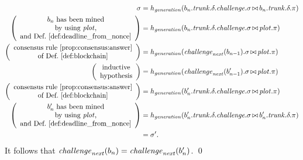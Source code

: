   \begin{align*}
    \sigma&=h_{\mathit{generation}}(b_n.{\mathit{trunk}}.\delta.{\mathit{challenge}}.\sigma\operatorname*{\bowtie} b_n.{\mathit{trunk}}.\delta.\pi)\\
    \left(\begin{array}{c}
      \text{$b_n$ has been mined}\\
      \text{by using ${\mathit{plot}}$,}\\
      \text{and Def.~\ref{def:deadline_from_nonce}}
    \end{array}\right)&=h_{\mathit{generation}}(b_n.{\mathit{trunk}}.\delta.{\mathit{challenge}}.\sigma\operatorname*{\bowtie}{\mathit{plot}}.\pi)\\
    \left(\begin{array}{c}
      \text{consensus rule~\ref{prop:consensus:answer}}\\
      \text{of Def.~\ref{def:blockchain}}
    \end{array}\right)&=h_{\mathit{generation}}({\mathit{challenge}}_{\mathit{next}}(b_{n-1}).\sigma\operatorname*{\bowtie}{\mathit{plot}}.\pi)\\
    \left(\begin{array}{c}
      \text{inductive}\\
      \text{hypothesis}
    \end{array}\right)&=h_{\mathit{generation}}({\mathit{challenge}}_{\mathit{next}}(b'_{n-1}).\sigma\operatorname*{\bowtie}{\mathit{plot}}.\pi)\\
    \left(\begin{array}{c}
      \text{consensus rule~\ref{prop:consensus:answer}}\\
      \text{of Def.~\ref{def:blockchain}}
    \end{array}\right)&=h_{\mathit{generation}}(b'_n.{\mathit{trunk}}.\delta.{\mathit{challenge}}.\sigma\operatorname*{\bowtie}{\mathit{plot}}.\pi)\\
    \left(\begin{array}{c}
      \text{$b'_n$ has been mined}\\
      \text{by using ${\mathit{plot}}$,}\\
      \text{and Def.~\ref{def:deadline_from_nonce}}
    \end{array}\right)&=h_{\mathit{generation}}(b'_n.{\mathit{trunk}}.\delta.{\mathit{challenge}}.\sigma\operatorname*{\bowtie} b'_n.{\mathit{trunk}}.\delta.\pi)\\
    &=\sigma'.
  \end{align*}
  It follows that ${\mathit{challenge}}_{\mathit{next}}(b_n)={\mathit{challenge}}_{\mathit{next}}(b'_n)$.
  \qed
